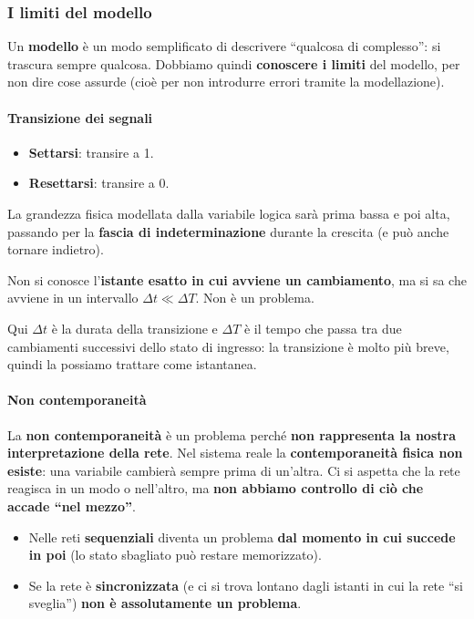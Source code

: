 \documentclass[11pt,a4paper]{article}
\begin{document}
\subsubsection*{I limiti del modello}

Un \textbf{modello} è un modo semplificato di descrivere ``qualcosa di complesso'': si trascura sempre qualcosa. Dobbiamo quindi \textbf{conoscere i limiti} del modello, per non dire cose assurde (cioè per non introdurre errori tramite la modellazione).

\paragraph*{Transizione dei segnali}

\begin{itemize}[leftmargin=*]
  \item \textbf{Settarsi}: transire a 1.
  \item \textbf{Resettarsi}: transire a 0.
\end{itemize}

La grandezza fisica modellata dalla variabile logica sarà prima bassa e poi alta, passando per la \textbf{fascia di indeterminazione} durante la crescita (e può anche tornare indietro).

Non si conosce l'\textbf{istante esatto in cui avviene un cambiamento}, ma si sa che avviene in un intervallo $\Delta t \ll \Delta T$. Non è un problema.

\begin{integrazione}
Qui $\Delta t$ è la durata della transizione e $\Delta T$ è il tempo che passa tra due cambiamenti successivi dello stato di ingresso: la transizione è molto più breve, quindi la possiamo trattare come istantanea.
\end{integrazione}

\paragraph*{Non contemporaneità}

La \textbf{non contemporaneità} è un problema perché \textbf{non rappresenta la nostra interpretazione della rete}. Nel sistema reale la \textbf{contemporaneità fisica non esiste}: una variabile cambierà sempre prima di un'altra. Ci si aspetta che la rete reagisca in un modo o nell'altro, ma \textbf{non abbiamo controllo di ciò che accade ``nel mezzo''}.

\begin{itemize}[leftmargin=*]
  \item Nelle reti \textbf{sequenziali} diventa un problema \textbf{dal momento in cui succede in poi} (lo stato sbagliato può restare memorizzato).
  \item Se la rete è \textbf{sincronizzata} (e ci si trova lontano dagli istanti in cui la rete ``si sveglia'') \textbf{non è assolutamente un problema}.
\end{itemize}
\end{document}
